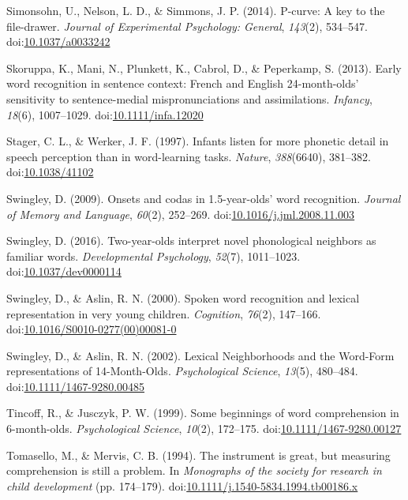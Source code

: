 \documentclass[man]{apa6}
\theoremstyle{definition}
\theoremstyle{definition}
\theoremstyle{definition}
\theoremstyle{remark}
\begin{document}
\hypertarget{ref-pcurve}{}
Simonsohn, U., Nelson, L. D., \& Simmons, J. P. (2014). P-curve: A key
to the file-drawer. \emph{Journal of Experimental Psychology: General},
\emph{143}(2), 534--547.
doi:\href{https://doi.org/10.1037/a0033242}{10.1037/a0033242}

\hypertarget{ref-Skoruppa2013}{}
Skoruppa, K., Mani, N., Plunkett, K., Cabrol, D., \& Peperkamp, S.
(2013). Early word recognition in sentence context: French and English
24-month-olds' sensitivity to sentence-medial mispronunciations and
assimilations. \emph{Infancy}, \emph{18}(6), 1007--1029.
doi:\href{https://doi.org/10.1111/infa.12020}{10.1111/infa.12020}

\hypertarget{ref-Stager1997}{}
Stager, C. L., \& Werker, J. F. (1997). Infants listen for more phonetic
detail in speech perception than in word-learning tasks. \emph{Nature},
\emph{388}(6640), 381--382.
doi:\href{https://doi.org/10.1038/41102}{10.1038/41102}

\hypertarget{ref-Swingley2009}{}
Swingley, D. (2009). Onsets and codas in 1.5-year-olds' word
recognition. \emph{Journal of Memory and Language}, \emph{60}(2),
252--269.
doi:\href{https://doi.org/10.1016/j.jml.2008.11.003}{10.1016/j.jml.2008.11.003}

\hypertarget{ref-Swingley2016}{}
Swingley, D. (2016). Two-year-olds interpret novel phonological
neighbors as familiar words. \emph{Developmental Psychology},
\emph{52}(7), 1011--1023.
doi:\href{https://doi.org/10.1037/dev0000114}{10.1037/dev0000114}

\hypertarget{ref-Swingley2000}{}
Swingley, D., \& Aslin, R. N. (2000). Spoken word recognition and
lexical representation in very young children. \emph{Cognition},
\emph{76}(2), 147--166.
doi:\href{https://doi.org/10.1016/S0010-0277(00)00081-0}{10.1016/S0010-0277(00)00081-0}

\hypertarget{ref-Swingley2002}{}
Swingley, D., \& Aslin, R. N. (2002). Lexical Neighborhoods and the
Word-Form representations of 14-Month-Olds. \emph{Psychological
Science}, \emph{13}(5), 480--484.
doi:\href{https://doi.org/10.1111/1467-9280.00485}{10.1111/1467-9280.00485}

\hypertarget{ref-Tincoff1999}{}
Tincoff, R., \& Jusczyk, P. W. (1999). Some beginnings of word
comprehension in 6-month-olds. \emph{Psychological Science},
\emph{10}(2), 172--175.
doi:\href{https://doi.org/10.1111/1467-9280.00127}{10.1111/1467-9280.00127}

\hypertarget{ref-Tomasello1994}{}
Tomasello, M., \& Mervis, C. B. (1994). The instrument is great, but
measuring comprehension is still a problem. In \emph{Monographs of the
society for research in child development} (pp. 174--179).
doi:\href{https://doi.org/10.1111/j.1540-5834.1994.tb00186.x}{10.1111/j.1540-5834.1994.tb00186.x}
\end{document}
